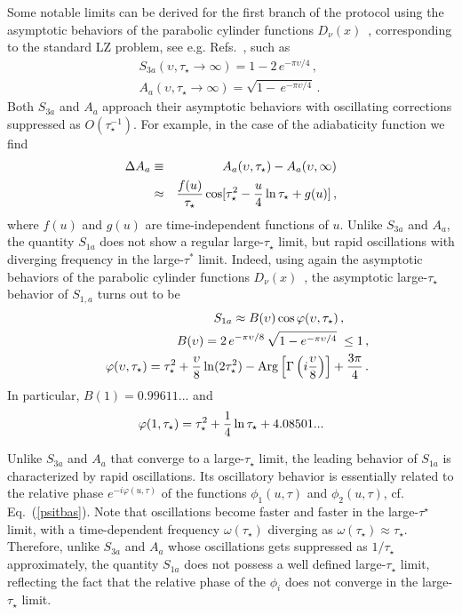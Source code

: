 Some notable limits can be derived for the first branch of the
protocol using the asymptotic behaviors of the parabolic cylinder
functions $D_\nu(x)$~\cite{vitanov1996landau,ISN-22}, corresponding to the
standard LZ problem, see e.g. Refs.~\cite{vitanov1996landau,pelissetto2018out}, such as
\begin{eqnarray}
&&S_{3a}(\upsilon,\tau_\star\to\infty)
= 1 - 2 \,e^{-{\pi \upsilon/4}}\,,\qquad
\label{lzlimit}\\
&&A_a(\upsilon,\tau_\star\to\infty) =
\sqrt{1 - \,e^{-{\pi \upsilon/4}}} \,.\nonumber
\end{eqnarray}
Both $S_{3a}$ and $A_a$ approach their asymptotic behaviors with
oscillating corrections suppressed as $O(\tau_\star^{-1})$. For
example, in the case of the adiabaticity function we find
\begin{eqnarray}
  \Delta A_a &\equiv& 
  A_a(\upsilon,\tau_\star) - A_a(\upsilon,\infty)   \label{asyoscA}\\
&\approx&
  {f(u)\over \tau_\star} \cos[\tau_\star^2 - {u\over 4}\ln\tau_\star +
  g(u)]\,,
\nonumber
\end{eqnarray}
where $f(u)$ and $g(u)$ are time-independent functions of $u$.
Unlike $S_{3a}$ and $A_a$,
the quantity $S_{1a}$ does not show a regular large-$\tau_\star$ limit,
but rapid oscillations with diverging frequency in the large-$\tau^*$
limit.  Indeed, using again the asymptotic behaviors of the parabolic
cylinder functions $D_\nu(x)$~\cite{vitanov1996landau,ISN-22}, the asymptotic
large-$\tau_\star$ behavior of $S_{1,a}$ turns out to be
\begin{eqnarray}
  &&  S_{1a} \approx B(\upsilon)
  \cos\varphi(\upsilon,\tau_\star)\,,\qquad
\label{asys1}\\
&& B(\upsilon)=  2 \,e^{-\pi\upsilon/8}\, 
\sqrt{1 - e^{- \pi\upsilon/4}}\; \le 1 \,,\nonumber\\
&& \varphi(\upsilon,\tau_\star) =
\tau_\star^2  + {\upsilon\over 8} \ln(2\tau_\star^2)
- {\rm Arg}\left[\Gamma\left(i{\upsilon\over 8}\right)\right]
+ {3\pi\over 4}\,.
\nonumber
 \end{eqnarray}
In particular, $B(1) = 0.99611...$ and
\begin{equation}
  \varphi(1,\tau_\star)= \tau_\star^2 + {1\over 4} \ln\tau_\star
  + 4.08501...
  \label{var1ttau}
\end{equation}

Unlike $S_{3a}$ and $A_a$ that converge to a large-$\tau_\star$ limit,
the leading behavior of $S_{1a}$ is characterized by rapid
oscillations. Its oscillatory behavior is essentially related to the
relative phase $e^{-i\varphi(u,\tau)}$ of the functions
$\phi_1(u,\tau)$ and $\phi_2(u,\tau)$, cf. Eq.~(\ref{psitbas}).  Note
that oscillations become faster and faster in the large-$\tau^\star$
limit, with a time-dependent frequency $\omega(\tau_\star)$ diverging
as $\omega(\tau_\star)\approx \tau_\star$.  Therefore, unlike $S_{3a}$
and $A_a$ whose oscillations gets suppressed as $1/\tau_\star$
approximately, the quantity $S_{1a}$ does not possess a well defined
large-$\tau_\star$ limit, reflecting the fact that the relative phase
of the $\phi_i$ does not converge in the large-$\tau_\star$ limit.



